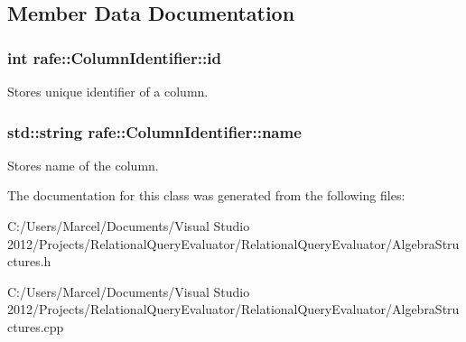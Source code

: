 \subsection{Member Data Documentation}
\hypertarget{classrafe_1_1_column_identifier_afa735a6e57d40b1d7e25c6cc781d3a4d}{
\subsubsection[{id}]{\setlength{\rightskip}{0pt plus 5cm}int rafe\+::\+Column\+Identifier\+::id}}\label{classrafe_1_1_column_identifier_afa735a6e57d40b1d7e25c6cc781d3a4d}
Stores unique identifier of a column. \hypertarget{classrafe_1_1_column_identifier_a65aaf13619c20f17be5f8bdda2c6d28f}{
\subsubsection[{name}]{\setlength{\rightskip}{0pt plus 5cm}std\+::string rafe\+::\+Column\+Identifier\+::name}}\label{classrafe_1_1_column_identifier_a65aaf13619c20f17be5f8bdda2c6d28f}
Stores name of the column. 

The documentation for this class was generated from the following files\+:\begin{DoxyCompactItemize}
\item 
C\+:/\+Users/\+Marcel/\+Documents/\+Visual Studio 2012/\+Projects/\+Relational\+Query\+Evaluator/\+Relational\+Query\+Evaluator/Algebra\+Structures.\+h\item 
C\+:/\+Users/\+Marcel/\+Documents/\+Visual Studio 2012/\+Projects/\+Relational\+Query\+Evaluator/\+Relational\+Query\+Evaluator/Algebra\+Structures.\+cpp\end{DoxyCompactItemize}
